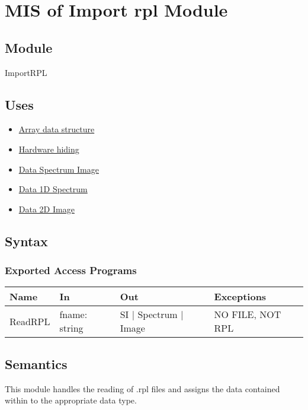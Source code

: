 \documentclass[12pt, titlepage]{article}
\begin{document}
\section{MIS of Import rpl Module} \label{Mod:ImportRPL}

\subsection{Module}

ImportRPL

\subsection{Uses}
\begin{itemize}
	\item \hyperref[Mod:Array]{Array data structure}
    \item \hyperref[Mod:HH]{Hardware hiding}
    \item \hyperref[Mod:SI]{Data Spectrum Image}
    \item \hyperref[Mod:Spectrum]{Data 1D Spectrum}
    \item \hyperref[Mod:Image]{Data 2D Image}
\end{itemize}

\subsection{Syntax}

\subsubsection{Exported Access Programs}

\begin{center}
\begin{tabular}{p{2cm} p{4cm} p{4cm} p{2cm}}
\hline
\textbf{Name} & \textbf{In} & \textbf{Out} & \textbf{Exceptions} \\
\hline
ReadRPL & fname: string & SI $|$ Spectrum $|$ Image & NO FILE, NOT RPL \\
\hline
\end{tabular}
\end{center}

\subsection{Semantics}
This module handles the reading of .rpl files and assigns the data contained within to the appropriate data type.
\end{document}
